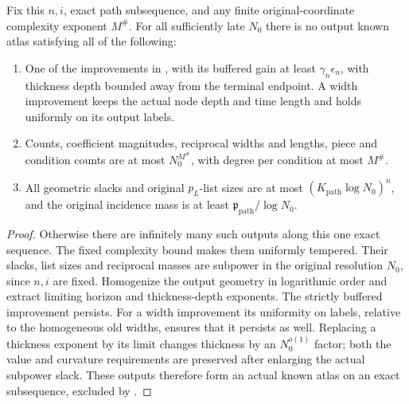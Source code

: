 \begin{lemma}\label{a03:finite-guard}
Fix this \(n,i\), exact path subsequence, and any finite original-coordinate
complexity exponent \(M^\#\).  For all sufficiently late \(N_0\) there
is no output known atlas satisfying all of the following:
\begin{enumerate}
\item One of the improvements in ,
with its buffered gain at least \(\gamma_n\epsilon_n\), with thickness
depth bounded away from the terminal endpoint.  A width improvement
keeps the actual node depth and time length and holds uniformly on its
output labels.
\item Counts, coefficient magnitudes, reciprocal widths and lengths,
piece and condition counts are at most \(N_0^{M^\#}\), with degree per
condition at most \(M^\#\).
\item All geometric slacks and original \(p_L\)-list sizes are at most
\((K_{\mathrm{path}}\log N_0)^n\), and the original incidence mass is
at least \(\mathfrak p_{\mathrm{path}}/\log N_0\).
\end{enumerate}
\end{lemma}
\begin{proof}
Otherwise there are infinitely many such outputs along this one exact
sequence.  The fixed complexity bound makes them uniformly tempered.
Their slacks, list sizes and reciprocal masses are subpower in the
original resolution \(N_0\), since \(n,i\) are fixed.  Homogenize the
output geometry in logarithmic order and extract limiting horizon and
thickness-depth exponents.  The strictly buffered improvement persists.
For a width improvement its uniformity on labels, relative to the
homogeneous old widths, ensures that it persists as well.  Replacing
a thickness exponent by its limit changes thickness by an
\(N_0^{o(1)}\) factor; both the value and curvature requirements are
preserved after enlarging the actual subpower slack.  These outputs
therefore form an actual known atlas on an exact subsequence, excluded
by .
\end{proof}

